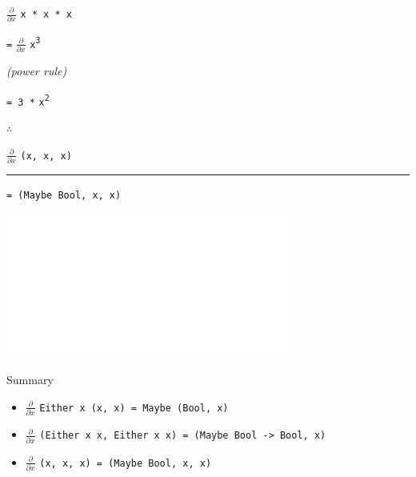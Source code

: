 \begin{frame}
\begin{center}
$\frac{\partial}{\partial x}$ \lstinline{x * x * x}

\lstinline{=} $\frac{\partial}{\partial x}$ \lstinline{x}\textsuperscript{\lstinline{3}}

\tiny{\emph{(power rule)}}\normalsize{}

\lstinline{= 3 *} \lstinline{x}\textsuperscript{\lstinline{2}}
\end{center}
\end{frame}


\begin{frame}
\begin{block}{$\therefore$}
\begin{center}
$\frac{\partial}{\partial x}$ \lstinline{(x, x, x)}

\par\noindent\rule{\textwidth}{0.4pt}

\lstinline{= (Maybe Bool, x, x)}
\end{center}
\end{block}
\end{frame}


\begin{frame}
\begin{center}
\includegraphics[width=0.3\textheight]{image/crosseyed-blank.png}
\end{center}
\begin{block}{Summary}
\begin{itemize}
  \item \scriptsize{$\frac{\partial}{\partial x}$ \lstinline{Either x (x, x) = Maybe (Bool, x)}}
  \item \scriptsize{$\frac{\partial}{\partial x}$ \lstinline{(Either x x, Either x x) = (Maybe Bool -> Bool, x)}}
  \item \scriptsize{$\frac{\partial}{\partial x}$ \lstinline{(x, x, x) = (Maybe Bool, x, x)}}
\end{itemize}
\end{block}
\end{frame}


